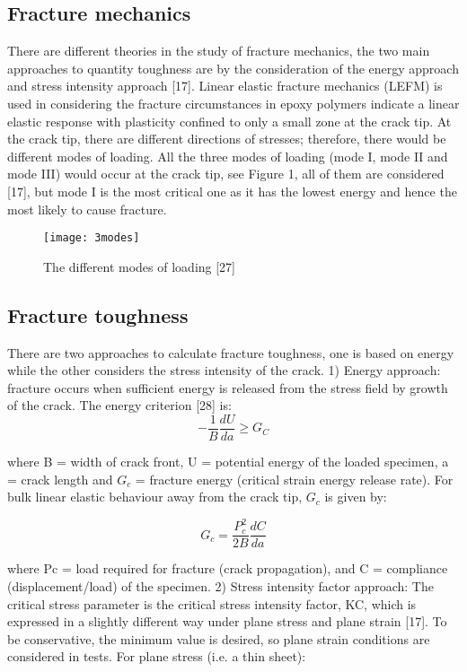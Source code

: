 \documentclass[numbers=noendperiod,chapterprefix=on]{icldt} %
\begin{document}
\subsection{Fracture mechanics}
There are different theories in the study of fracture mechanics, the two main approaches to quantity toughness are by the consideration of the energy approach and stress intensity approach [17]. Linear elastic fracture mechanics (LEFM) is used in considering the fracture circumstances in epoxy polymers indicate a linear elastic response with plasticity confined to only a small zone at the crack tip.
At the crack tip, there are different directions of stresses; therefore, there would be different modes of loading. All the three modes of loading (mode I, mode II and mode III) would occur at the crack tip, see Figure 1, all of them are considered [17], but mode I is the most critical one as it has the lowest energy and hence the most likely to cause fracture. 
\begin{figure}[!htpb]
\centering
\texttt{[image: 3modes]}
\caption{The different modes of loading [27]}
\end{figure}

\subsection{Fracture toughness}
There are two approaches to calculate fracture toughness, one is based on energy while the other considers the stress intensity of the crack.
1) Energy approach: fracture occurs when sufficient energy is released from the stress field by growth of the crack. The energy criterion [28] is:
\begin{equation} \label{Energy criterion [28]}
-\frac{1}{B} \frac{dU}{da} \geq G_C 
\end{equation}

where B = width of crack front, U = potential energy of the loaded specimen, a = crack length and $G_c$ = fracture energy (critical strain energy release rate). 
For bulk linear elastic behaviour away from the crack tip, $G_c$ is given by:

\begin{equation} \label{fracture energy [28]}
G_c=\frac{P^2_c}{2B} \frac{dC}{da}
\end{equation}

where Pc = load required for fracture (crack propagation), and C = compliance (displacement/load) of the specimen.
2) Stress intensity factor approach: The critical stress parameter is the critical stress intensity factor, KC, which is expressed in a slightly different way under plane stress and plane strain [17]. To be conservative, the minimum value is desired, so plane strain conditions are considered in tests. 
For plane stress (i.e. a thin sheet): 
\end{document}
